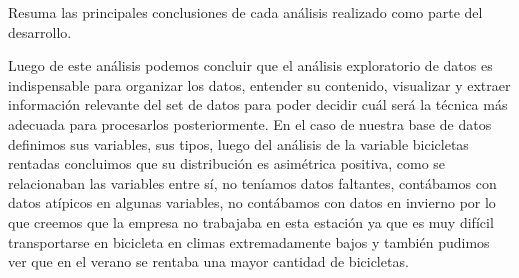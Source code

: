 \documentclass[]{elsarticle} %
\begin{document}
Resuma las principales conclusiones de cada análisis realizado como
parte del desarrollo.

Luego de este análisis podemos concluir que el análisis exploratorio de
datos es indispensable para organizar los datos, entender su contenido,
visualizar y extraer información relevante del set de datos para poder
decidir cuál será la técnica más adecuada para procesarlos
posteriormente. En el caso de nuestra base de datos definimos sus
variables, sus tipos, luego del análisis de la variable bicicletas
rentadas concluimos que su distribución es asimétrica positiva, como se
relacionaban las variables entre sí, no teníamos datos faltantes,
contábamos con datos atípicos en algunas variables, no contábamos con
datos en invierno por lo que creemos que la empresa no trabajaba en esta
estación ya que es muy difícil transportarse en bicicleta en climas
extremadamente bajos y también pudimos ver que en el verano se rentaba
una mayor cantidad de bicicletas.
\end{document}
